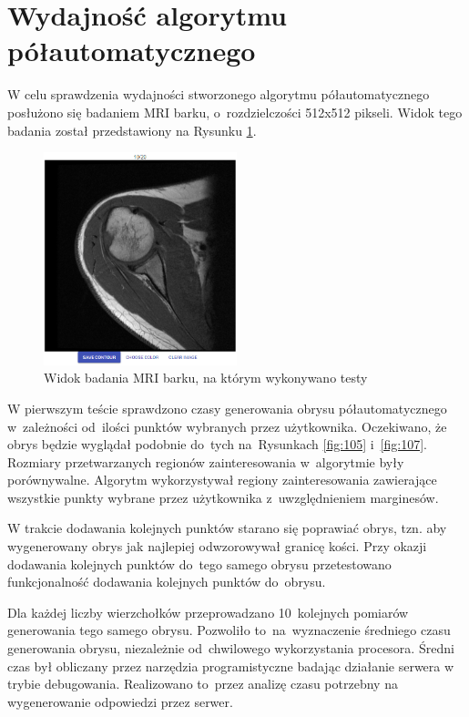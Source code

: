 \documentclass[a4paper,11pt,twoside,openright]{report}
\theoremstyle{definition}
\begin{document}
\section {Wydajność algorytmu półautomatycznego}

W celu sprawdzenia wydajności stworzonego algorytmu półautomatycznego posłużono
się badaniem MRI barku, o~rozdzielczości 512x512 pikseli. Widok tego badania został przedstawiony
na Rysunku \ref{fig:112}.

\begin{figure}[h!]
	\center
	\includegraphics[width=0.5\textwidth]{112}
	\caption{Widok badania MRI barku, na którym wykonywano testy}
    	\label{fig:112}
\end{figure}

\pagebreak

W pierwszym teście sprawdzono czasy generowania obrysu półautomatycznego
 w~zależności od~ilości punktów wybranych przez użytkownika. Oczekiwano,
że obrys będzie wyglądał podobnie do~tych na~Rysunkach \ref{fig:105} i~\ref{fig:107}.
Rozmiary przetwarzanych regionów zainteresowania w~algorytmie były porównywalne. Algorytm
wykorzystywał regiony zainteresowania zawierające wszystkie punkty wybrane
przez użytkownika z~uwzględnieniem marginesów.

W trakcie dodawania kolejnych punktów starano się poprawiać obrys, tzn. aby
wygenerowany obrys jak najlepiej odwzorowywał granicę kości. Przy okazji dodawania kolejnych
punktów do~tego samego obrysu przetestowano funkcjonalność dodawania kolejnych
punktów do~obrysu.

Dla każdej liczby wierzchołków przeprowadzano 10~kolejnych pomiarów generowania
tego samego obrysu. Pozwoliło to~na~wyznaczenie średniego czasu generowania obrysu,
niezależnie od~chwilowego wykorzystania procesora. Średni czas był obliczany przez narzędzia 
programistyczne badając działanie serwera w trybie debugowania. Realizowano to~przez
analizę czasu potrzebny na wygenerowanie odpowiedzi przez serwer.
\end{document}
